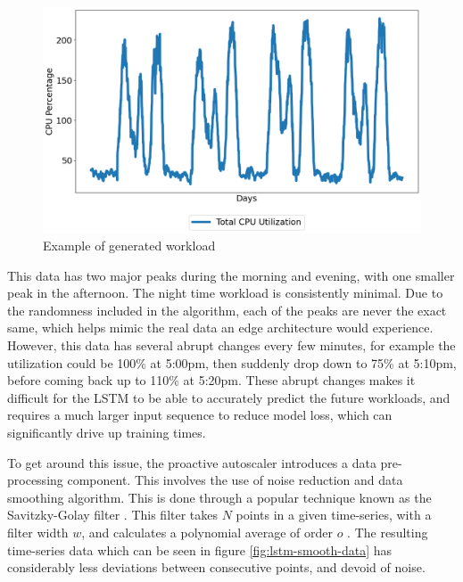 \begin{figure}[htb]
    \centering
    \caption{Example of generated workload}
    \label{fig:lstm-init-data}
    \includegraphics[width=1.0\linewidth]{Figures/LSTM-Initial-Data.png}
\end{figure}

This data has two major peaks during the morning and evening, with one smaller peak in the afternoon. The night time workload is consistently minimal. Due to the randomness included in the algorithm, each of the peaks are never the exact same, which helps mimic the real data an edge architecture would experience. However, this data has several abrupt changes every few minutes, for example the utilization could be 100\% at 5:00pm, then suddenly drop down to 75\% at 5:10pm, before coming back up to 110\% at 5:20pm. These abrupt changes makes it difficult for the LSTM to be able to accurately predict the future workloads, and requires a much larger input sequence to reduce model loss, which can significantly drive up training times.\par

To get around this issue, the proactive autoscaler introduces a data pre-processing component. This involves the use of noise reduction and data smoothing algorithm. This is done through a popular technique known as the Savitzky-Golay filter \cite{savitzky1964smoothing}. This filter takes $N$ points in a given time-series, with a filter width $w$, and calculates a polynomial average of order $o$ \cite{schafer2011savitzky}. The resulting time-series data which can be seen in figure \ref{fig:lstm-smooth-data} has considerably less deviations between consecutive points, and devoid of noise.\par

